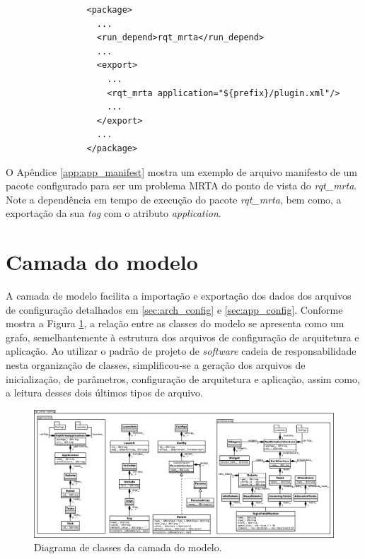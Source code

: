             \begin{lstlisting}
                <package>
                  ...
                  <run_depend>rqt_mrta</run_depend>
                  ...
                  <export>
                    ...
                    <rqt_mrta application="${prefix}/plugin.xml"/>
                    ...
                  </export>
                  ...
                </package>
            \end{lstlisting}
            
            O Apêndice \ref{app:app_manifest} mostra um exemplo de arquivo manifesto de um pacote configurado para ser um problema MRTA do ponto de vista do \textit{rqt\_mrta}. Note a dependência em tempo de execução do pacote \textit{rqt\_mrta}, bem como, a exportação da sua \textit{tag} com o atributo \textit{application}.
    
    \section{Camada do modelo} \label{subset:rqt_mrta_model}
        A camada de modelo facilita a importação e exportação dos dados dos arquivos de configuração detalhados em \ref{sec:arch_config} e \ref{sec:app_config}. Conforme mostra a Figura \ref{fig:rqt_mrta_model_uml}, a relação entre as classes do modelo se apresenta como um grafo, semelhantemente à estrutura dos arquivos de configuração de arquitetura e aplicação. Ao utilizar o padrão de projeto de \textit{software} cadeia de responsabilidade \cite{ref:gamma1993design} nesta organização de classes, simplificou-se a geração dos arquivos de inicialização, de parâmetros, configuração de arquitetura e aplicação, assim como, a leitura desses dois últimos tipos de arquivo.
        
        \begin{figure}[p]
            \centering
            \includegraphics[width=.95\textheight,angle=90]{Figuras/3_desenvolvimento/rqt_mrta_model_uml.eps}
            \caption{Diagrama de classes da camada do modelo.} \label{fig:rqt_mrta_model_uml}
        \end{figure}
        
